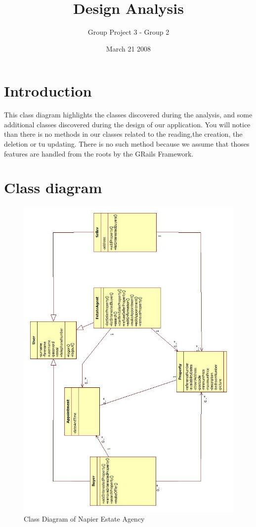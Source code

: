 \documentclass[a4paper,12pt]{article}
\title{Design Analysis}
\author{Group Project 3 - Group 2}
\date{March 21 2008}
\begin{document}
\maketitle
\newpage
\tableofcontents
\newpage



\section{Introduction}
This class diagram highlights the classes discovered during the analysis,
and some additional classes discovered during the design of our application.
You will notice than there is no methods in our classes related to the reading,the creation, the deletion or tu updating.
There is no such method because we assume that thoses features are handled from the roots by the GRails Framework.

\section{Class diagram}
\begin{figure}[htbp]
\begin{center}
\includegraphics[width=\linewidth]{pics/classDiagram.jpg}
\end{center}
\caption{\footnotesize Class Diagram of Napier Estate Agency}
\end{figure}
\end{document}
